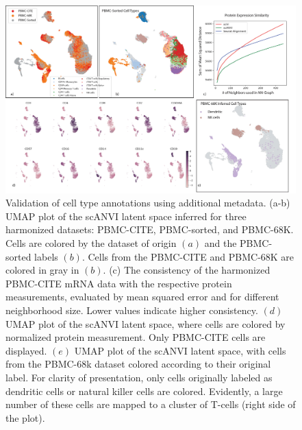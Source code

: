 \begin{figure}
\centering
\includegraphics[width=\textwidth]{figures/labels_concored.jpg}
\caption[Validation of cell type annotations using additional metadata]{Validation of cell type annotations using additional metadata. (a-b) UMAP plot of the scANVI latent space inferred for three harmonized datasets: PBMC-CITE, PBMC-sorted, and PBMC-68K. Cells are colored by the dataset of origin $(a)$ and the PBMC-sorted labels $(b)$. Cells from the PBMC-CITE and PBMC-68K are colored in gray in $(b)$. (c) The consistency of the harmonized PBMC-CITE mRNA data with the respective protein measurements, evaluated by mean squared error and for different neighborhood size. Lower values indicate higher consistency. $(d)$ UMAP plot of the scANVI latent space, where cells are colored by normalized protein measurement. Only PBMC-CITE cells are displayed. $(e)$ UMAP plot of the scANVI latent space, with cells from the PBMC-68k dataset colored according to their original label. For clarity of presentation, only cells originally labeled as dendritic cells or natural killer cells are colored. Evidently, a large number of these cells are mapped to a cluster of T-cells (right side of the plot).}
\label{scanviconcordance_panel}
\end{figure}



